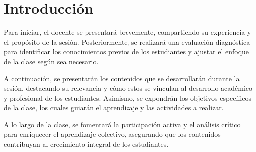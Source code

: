 \section{Introducción}

Para iniciar, el docente se presentará brevemente, compartiendo su experiencia y el propósito de la sesión. Posteriormente, se realizará una evaluación diagnóstica para identificar los conocimientos previos de los estudiantes y ajustar el enfoque de la clase según sea necesario.

A continuación, se presentarán los contenidos que se desarrollarán durante la sesión, destacando su relevancia y cómo estos se vinculan al desarrollo académico y profesional de los estudiantes. Asimismo, se expondrán los objetivos específicos de la clase, los cuales guiarán el aprendizaje y las actividades a realizar.

A lo largo de la clase, se fomentará la participación activa y el análisis crítico para enriquecer el aprendizaje colectivo, asegurando que los contenidos contribuyan al crecimiento integral de los estudiantes.